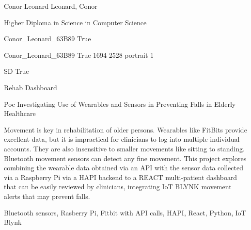 
\begingroup{}\relax



\def\Key{Conor_Leonard_63B89}

{Conor Leonard}
{Leonard, Conor}

{Higher Diploma in Science in Computer Science}

{Conor_Leonard_63B89}
{True}

{Conor_Leonard_63B89}
{True}
{1694}
{2528}
{portrait}
{1}

{SD}
{True}

{Rehab Dashboard}

{Poc Investigating Use of Wearables and Sensors in Preventing Falls in Elderly Healthcare}

{Movement is key in rehabilitation of older persons.  Wearables like FitBits provide excellent data, but it is impractical for clinicians to log into multiple individual accounts. They are also insensitive to smaller movements like sitting to standing. Bluetooth movement sensors can detect any fine movement. This project explores combining the wearable data obtained via an API with the sensor data collected via a Raspberry Pi via a HAPI backend to a REACT multi-patient dashboard that can be easily reviewed by clinicians, integrating IoT BLYNK movement alerts that may prevent falls.}

{Bluetooth sensors, Rasberry Pi, Fitbit with API calls, HAPI, React, Python, IoT Blynk}

